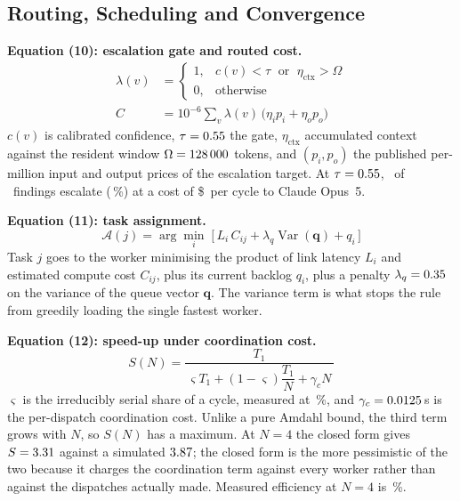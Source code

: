 \documentclass[journal]{IEEEtran}
\begin{document}
\subsection{Routing, Scheduling and Convergence}

\textbf{Equation (10): escalation gate and routed cost.}
\begin{equation}
  \begin{aligned}
    \lambda(v) &=
    \begin{cases}
      1, & c(v) < \tau \;\text{ or }\; \eta_{\mathrm{ctx}} > \Omega\\
      0, & \text{otherwise}
    \end{cases}\\[2pt]
    C &= 10^{-6}\sum_{v} \lambda(v)\,
         \bigl(\eta_{i} p_{i} + \eta_{o} p_{o}\bigr)
  \end{aligned}
  \label{eq:route}
\end{equation}
$c(v)$ is calibrated confidence, $\tau=0.55$ the gate, $\eta_{\mathrm{ctx}}$
accumulated context against the resident window $\Omega=128\,000$ tokens, and
$(p_i,p_o)$ the published per-million input and output prices of the
escalation target. At $\tau=0.55$, \nEsc\ of \numVuln\ findings escalate
(\escFrac\,\%) at a cost of \$\costOpus\ per cycle to Claude Opus~5.

\textbf{Equation (11): task assignment.}
\begin{equation}
  \mathcal{A}(j) = \arg\min_{i}\;
      \bigl[\, L_i \, C_{ij} + \lambda_q \operatorname{Var}(\mathbf{q})
      + q_i \,\bigr]
  \label{eq:assign}
\end{equation}
Task $j$ goes to the worker minimising the product of link latency $L_i$ and
estimated compute cost $C_{ij}$, plus its current backlog $q_i$, plus a
penalty $\lambda_q=0.35$ on the variance of the queue vector $\mathbf{q}$.
The variance term is what stops the rule from greedily loading the single
fastest worker.

\textbf{Equation (12): speed-up under coordination cost.}
\begin{equation}
  S(N) = \frac{T_1}
   {\,\varsigma T_1 + (1-\varsigma)\dfrac{T_1}{N} + \gamma_c N\,}
  \label{eq:speedup}
\end{equation}
$\varsigma$ is the irreducibly serial share of a cycle, measured at
\serialFrac\,\%, and $\gamma_c=0.0125$\,s is the per-dispatch coordination
cost. Unlike a pure Amdahl bound, the third term grows with $N$, so $S(N)$ has
a maximum. At $N=4$ the closed form gives $S=3.31$ against a simulated
$3.87$; the closed form is the more pessimistic of the two because it
charges the coordination term against every worker rather than against the
dispatches actually made. Measured efficiency at $N=4$ is \effC\,\%.
\end{document}
